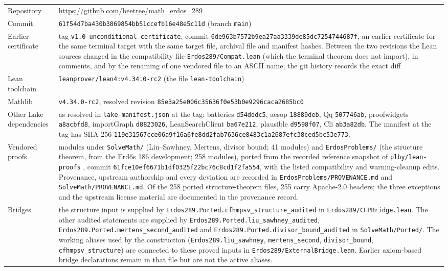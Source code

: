\documentclass[11pt,letterpaper]{article}
\numberwithin{equation}{section}
\theoremstyle{plain}
\theoremstyle{remark}
\begin{document}
\begin{center}
\footnotesize
\begin{tabular}{@{}>{\raggedright\arraybackslash}p{3.4cm}>{\raggedright\arraybackslash}p{12.4cm}@{}}
\toprule
Repository & \url{https://github.com/beetree/math_erdos_289}\\
Commit & \texttt{61f54d7ba430b3869854bb51ccefb16e48e5c11d} (branch \texttt{main})\\
Earlier certificate & tag \texttt{v1.0-unconditional-certificate}, commit \texttt{6de963b7572b9ea27aa3339de85dc7254744687f}, an earlier certificate for the same terminal target with the same target file, archival file and manifest hashes. Between the two revisions the Lean sources changed in the compatibility file \texttt{Erdos289/Compat.lean} (which the terminal theorem does not import), in comments, and by the renaming of one vendored file to an ASCII name; the git history records the exact diff\\
Lean toolchain & \texttt{leanprover/lean4:v4.34.0-rc2} (the file \texttt{lean-toolchain})\\
Mathlib & \texttt{v4.34.0-rc2}, resolved revision \texttt{85e3a25e006c35636f0e53b0e9296caca2685bc0}\\
Other Lake dependencies & as resolved in \texttt{lake-manifest.json} at the tag: batteries \texttt{d54dddc5}, aesop \texttt{18889deb}, Qq \texttt{507746ab}, proofwidgets \texttt{a8acbfd8}, importGraph \texttt{d8823026}, LeanSearchClient \texttt{ba67e212}, plausible \texttt{d9598f07}, Cli \texttt{ab3a82db}. The manifest at the tag has SHA-256 \texttt{119e31567cce06a9f16a6fe8dd2fab7636ce8483c1a2687efc38ced5bc53e773}.\\
Vendored proofs & modules under \texttt{SolveMath/} (Liu--Sawhney, Mertens, divisor bound; 41 modules) and \texttt{ErdosProblems/} (the structure theorem, from the Erd\H{o}s 186 development; 258 modules), ported from the recorded reference snapshot of \texttt{plby/lean-proofs} \cite{plby}, commit \texttt{61fce10ef6671b1df0325f22bc76c8cd1f2fa554}, with the listed compatibility and warning-cleanup edits. Provenance, upstream authorship and every deviation are recorded in \texttt{ErdosProblems/PROVENANCE.md} and \texttt{SolveMath/PROVENANCE.md}. Of the 258 ported structure-theorem files, 255 carry Apache-2.0 headers; the three exceptions and the upstream license material are documented in the provenance record.\\
Bridges & the structure input is supplied by \texttt{Erdos289.Ported.cfhmpsv\_structure\_audited} in \texttt{Erdos289/CFPBridge.lean}. The other audited statements are supplied by \texttt{Erdos289.Ported.liu\_sawhney\_audited}, \texttt{Erdos289.Ported.mertens\_second\_audited} and \texttt{Erdos289.Ported.divisor\_bound\_audited} in \texttt{SolveMath/Ported/}. The working aliases used by the construction (\texttt{Erdos289.liu\_sawhney}, \texttt{mertens\_second}, \texttt{divisor\_bound}, \texttt{cfhmpsv\_structure}) are connected to these proved inputs in \texttt{Erdos289/ExternalBridge.lean}. Earlier axiom-based bridge declarations remain in that file but are not the active aliases.\\

\end{tabular}
\end{center}
\end{document}
